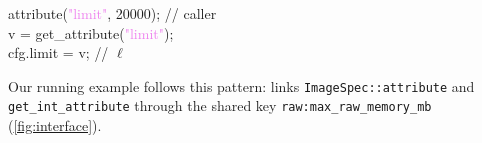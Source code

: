 \begin{tcolorbox}[
  colback=gray!8,
  colframe=gray!35,
  boxrule=0.4pt,
  arc=1pt,
  left=5pt,
  right=3pt,
  top=1pt,
  bottom=1pt
]
\small\ttfamily
attribute(\textcolor{violet}{"limit"}, \textcolor{blue!77!black}{20000}); \quad \textcolor{citegray}{// caller}\\
\textcolor{blue!77!black}{v} = get\_attribute(\textcolor{violet}{"limit"});\\
\textcolor{red!77!black}{cfg.limit} = \textcolor{blue!77!black}{v}; \quad \textcolor{citegray}{// $\ell$}
\end{tcolorbox}
\noindent Our running example follows this pattern: \sys links \texttt{ImageSpec::attribute} and \texttt{get\_int\_attribute} through the shared key \texttt{raw:max\_raw\_memory\_mb}
(\autoref{fig:interface}).


